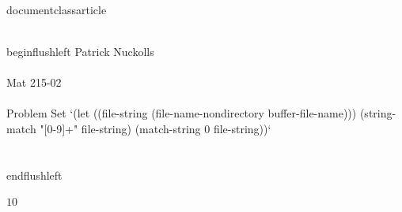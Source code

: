 \\documentclass{article}
\begin{document}
\\begin{flushleft}
	Patrick Nuckolls \\\\
	Mat 215-02 \\\\
	Problem Set `(let ((file-string (file-name-nondirectory buffer-file-name))) (string-match "[0-9]+" file-string) (match-string 0 file-string))` \\\\
\\end{flushleft}

$1$0

\
\end{document}
